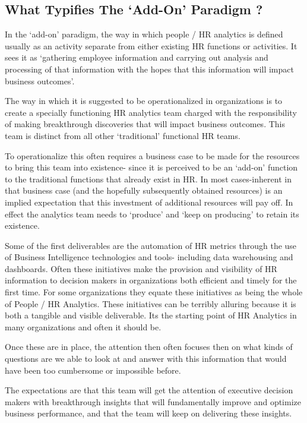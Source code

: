 \documentclass[12pt,letterpaper]{article}
\begin{document}
\subsection{What Typifies The `Add-On' Paradigm
?}\label{what-typifies-the-add-on-paradigm}

In the `add-on' paradigm, the way in which people / HR analytics is
defined usually as an activity separate from either existing HR
functions or activities. It sees it as `gathering employee information
and carrying out analysis and processing of that information with the
hopes that this information will impact business outcomes'.

The way in which it is suggested to be operationalized in organizations
is to create a specially functioning HR analytics team charged with the
responsibility of making breakthrough discoveries that will impact
business outcomes. This team is distinct from all other `traditional'
functional HR teams.

To operationalize this often requires a business case to be made for the
resources to bring this team into existence- since it is perceived to be
an `add-on' function to the traditional functions that already exist in
HR. In most cases-inherent in that business case (and the hopefully
subsequently obtained resources) is an implied expectation that this
investment of additional resources will pay off. In effect the analytics
team needs to `produce' and `keep on producing' to retain its existence.

Some of the first deliverables are the automation of HR metrics through
the use of Business Intelligence technologies and tools- including data
warehousing and dashboards. Often these initiatives make the provision
and visibility of HR information to decision makers in organizations
both efficient and timely for the first time. For some organizations
they equate these initiatives as being the whole of People / HR
Analytics. These initiatives can be terribly alluring because it is both
a tangible and visible deliverable. Its the starting point of HR
Analytics in many organizations and often it should be.

Once these are in place, the attention then often focuses then on what
kinds of questions are we able to look at and answer with this
information that would have been too cumbersome or impossible before.

The expectations are that this team will get the attention of executive
decision makers with breakthrough insights that will fundamentally
improve and optimize business performance, and that the team will keep
on delivering these insights.
\end{document}

